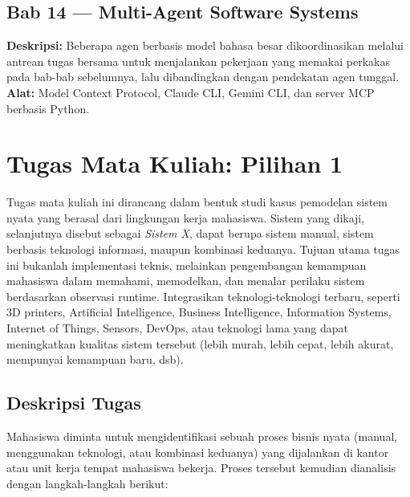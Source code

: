 \subsection*{Bab 14 --- Multi-Agent Software Systems}
\textbf{Deskripsi:} Beberapa agen berbasis model bahasa besar dikoordinasikan melalui antrean tugas bersama untuk menjalankan pekerjaan yang memakai perkakas pada bab-bab sebelumnya, lalu dibandingkan dengan pendekatan agen tunggal.
\textbf{Alat:} Model Context Protocol, Claude CLI, Gemini CLI, dan server MCP berbasis Python.

\section*{Tugas Mata Kuliah: Pilihan 1}

Tugas mata kuliah ini dirancang dalam bentuk studi kasus pemodelan sistem nyata yang berasal dari lingkungan kerja mahasiswa. Sistem yang dikaji, selanjutnya disebut sebagai \textit{Sistem X}, dapat berupa sistem manual, sistem berbasis teknologi informasi, maupun kombinasi keduanya. Tujuan utama tugas ini bukanlah implementasi teknis, melainkan pengembangan kemampuan mahasiswa dalam memahami, memodelkan, dan menalar perilaku sistem berdasarkan observasi runtime. Integrasikan teknologi-teknologi terbaru, seperti 3D printers, Artificial Intelligence, Business Intelligence, Information Systems, Internet of Things, Sensors, DevOps, atau teknologi lama yang dapat meningkatkan kualitas sistem tersebut (lebih murah, lebih cepat, lebih akurat, mempunyai kemampuan baru, dsb).

\subsection*{Deskripsi Tugas}

Mahasiswa diminta untuk mengidentifikasi sebuah proses bisnis nyata (manual, menggunakan teknologi, atau kombinasi keduanya) yang dijalankan di kantor atau unit kerja tempat mahasiswa bekerja. Proses tersebut kemudian dianalisis dengan langkah-langkah berikut:

